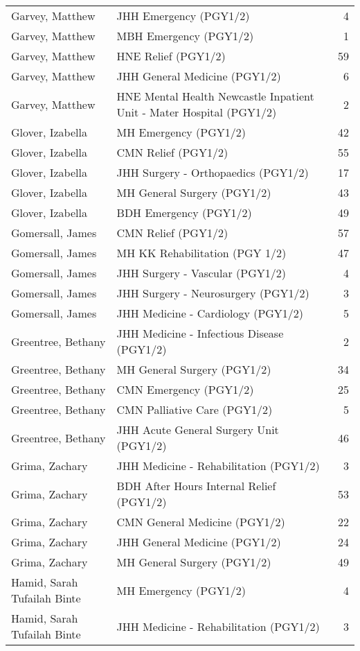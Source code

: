 \documentclass[
]{article}
\begin{document}
\begin{longtable}{llr}
Garvey, Matthew & JHH Emergency (PGY1/2) & 4 \\ 
Garvey, Matthew & MBH Emergency (PGY1/2) & 1 \\ 
Garvey, Matthew & HNE Relief (PGY1/2) & 59 \\ 
Garvey, Matthew & JHH General Medicine (PGY1/2) & 6 \\ 
Garvey, Matthew & HNE Mental Health Newcastle Inpatient Unit - Mater Hospital (PGY1/2) & 2 \\ 
Glover, Izabella & MH Emergency (PGY1/2) & 42 \\ 
Glover, Izabella & CMN Relief (PGY1/2) & 55 \\ 
Glover, Izabella & JHH Surgery - Orthopaedics (PGY1/2) & 17 \\ 
Glover, Izabella & MH General Surgery (PGY1/2) & 43 \\ 
Glover, Izabella & BDH Emergency (PGY1/2) & 49 \\ 
Gomersall, James & CMN Relief (PGY1/2) & 57 \\ 
Gomersall, James & MH KK Rehabilitation (PGY 1/2) & 47 \\ 
Gomersall, James & JHH Surgery - Vascular (PGY1/2) & 4 \\ 
Gomersall, James & JHH Surgery - Neurosurgery (PGY1/2) & 3 \\ 
Gomersall, James & JHH Medicine - Cardiology (PGY1/2) & 5 \\ 
Greentree, Bethany & JHH Medicine - Infectious Disease (PGY1/2) & 2 \\ 
Greentree, Bethany & MH General Surgery (PGY1/2) & 34 \\ 
Greentree, Bethany & CMN Emergency (PGY1/2) & 25 \\ 
Greentree, Bethany & CMN Palliative Care (PGY1/2) & 5 \\ 
Greentree, Bethany & JHH Acute General Surgery Unit (PGY1/2) & 46 \\ 
Grima, Zachary & JHH Medicine - Rehabilitation (PGY1/2) & 3 \\ 
Grima, Zachary & BDH After Hours Internal Relief (PGY1/2) & 53 \\ 
Grima, Zachary & CMN General Medicine (PGY1/2) & 22 \\ 
Grima, Zachary & JHH General Medicine (PGY1/2) & 24 \\ 
Grima, Zachary & MH General Surgery (PGY1/2) & 49 \\ 
Hamid, Sarah Tufailah Binte & MH Emergency (PGY1/2) & 4 \\ 
Hamid, Sarah Tufailah Binte & JHH Medicine - Rehabilitation (PGY1/2) & 3 \\ 

\end{longtable}
\end{document}
